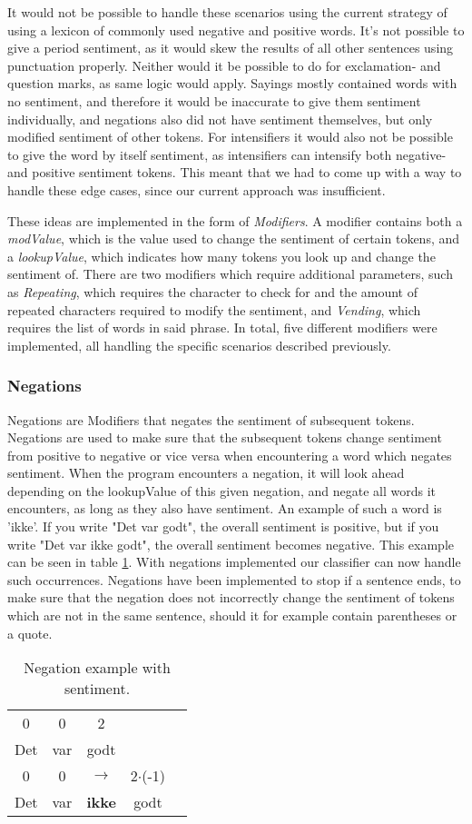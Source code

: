 It would not be possible to handle these scenarios using the current strategy of using a lexicon of commonly used negative and positive words. It's not possible to give a period sentiment, as it would skew the results of all other sentences using punctuation properly. Neither would it be possible to do for exclamation- and question marks, as same logic would apply. Sayings mostly contained words with no sentiment, and therefore it would be inaccurate to give them sentiment individually, and negations also did not have sentiment themselves, but only modified sentiment of other tokens. For intensifiers it would also not be possible to give the word by itself sentiment, as intensifiers can intensify both negative- and positive sentiment tokens. This meant that we had to come up with a way to handle these edge cases, since our current approach was insufficient.

These ideas are implemented in the form of \textit{Modifiers}. A modifier contains both a \textit{modValue}, which is the value used to change the sentiment of certain tokens, and a \textit{lookupValue}, which indicates how many tokens you look up and change the sentiment of. There are two modifiers which require additional parameters, such as \textit{Repeating}, which requires the character to check for and the amount of repeated characters required to modify the sentiment, and \textit{Vending}, which requires the list of words in said phrase. In total, five different modifiers were implemented, all handling the specific scenarios described previously.

\subsubsection{Negations}
Negations are Modifiers that negates the sentiment of subsequent tokens. Negations are used to make sure that the subsequent tokens change sentiment from positive to negative or vice versa when encountering a word which negates sentiment. When the program encounters a negation, it will look ahead depending on the lookupValue of this given negation, and negate all words it encounters, as long as they also have sentiment. An example of such a word is 'ikke'. If you write "Det var godt", the overall sentiment is positive, but if you write "Det var ikke godt", the overall sentiment becomes negative. This example can be seen in table \ref{negateexample}. With negations implemented our classifier can now handle such occurrences. Negations have been implemented to stop if a sentence ends, to make sure that the negation does not incorrectly change the sentiment of tokens which are not in the same sentence, should it for example contain parentheses or a quote.
\begin{table}[H]
	\begin{tabular}{ccccc} 
		0 & 0 & 2 & & \\ 
		Det & var & godt & & \\ 
		0 & 0 & $\rightarrow$ & 2$\cdot$(-1) & \\ 
		Det & var & \textbf{ikke} & godt & 
	\end{tabular}
	\centering
	\caption{Negation example with sentiment.}
	\label{negateexample}
\end{table}

